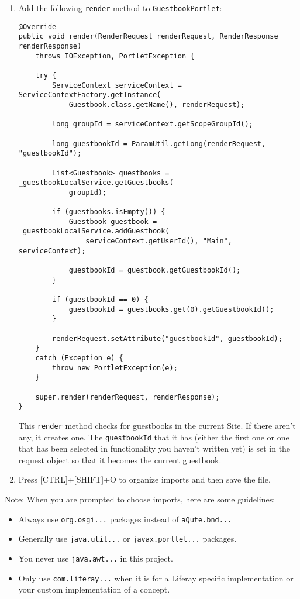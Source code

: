 \begin{enumerate}
\def\labelenumi{\arabic{enumi}.}
\item
  Add the following \texttt{render} method to \texttt{GuestbookPortlet}:

\begin{verbatim}
@Override
public void render(RenderRequest renderRequest, RenderResponse renderResponse)
    throws IOException, PortletException {

    try {
        ServiceContext serviceContext = ServiceContextFactory.getInstance(
            Guestbook.class.getName(), renderRequest);

        long groupId = serviceContext.getScopeGroupId();

        long guestbookId = ParamUtil.getLong(renderRequest, "guestbookId");

        List<Guestbook> guestbooks = _guestbookLocalService.getGuestbooks(
            groupId);

        if (guestbooks.isEmpty()) {
            Guestbook guestbook = _guestbookLocalService.addGuestbook(
                serviceContext.getUserId(), "Main", serviceContext);

            guestbookId = guestbook.getGuestbookId();
        }

        if (guestbookId == 0) {
            guestbookId = guestbooks.get(0).getGuestbookId();
        }

        renderRequest.setAttribute("guestbookId", guestbookId);
    }
    catch (Exception e) {
        throw new PortletException(e);
    }

    super.render(renderRequest, renderResponse);
}
\end{verbatim}

  This \texttt{render} method checks for guestbooks in the current Site.
  If there aren't any, it creates one. The \texttt{guestbookId} that it
  has (either the first one or one that has been selected in
  functionality you haven't written yet) is set in the request object so
  that it becomes the current guestbook.
\item
  Press {[}CTRL{]}+{[}SHIFT{]}+O to organize imports and then save the
  file.
\end{enumerate}

\noindent\hrulefill

Note: When you are prompted to choose imports, here are some guidelines:

\begin{itemize}
\item
  Always use \texttt{org.osgi...} packages instead of
  \texttt{aQute.bnd...}
\item
  Generally use \texttt{java.util...} or \texttt{javax.portlet...}
  packages.
\item
  You never use \texttt{java.awt...} in this project.
\item
  Only use \texttt{com.liferay...} when it is for a Liferay specific
  implementation or your custom implementation of a concept.
\end{itemize}

